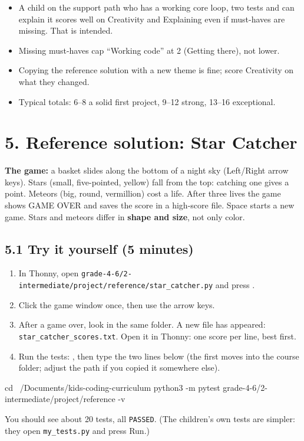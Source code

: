 \documentclass[level=2,teacher]{kidscode}
\begin{document}
\begin{teachernote}
\begin{itemize}[itemsep=1pt]
  \item A child on the support path who has a working core loop, two tests and can explain it scores
        well on Creativity and Explaining even if must-haves are missing. That is intended.
  \item Missing must-haves cap \enquote{Working code} at 2 (Getting there), not lower.
  \item Copying the reference solution with a new theme is fine; score Creativity on what they changed.
  \item Typical totals: 6--8 a solid first project, 9--12 strong, 13--16 exceptional.
\end{itemize}
\end{teachernote}

\section{5. Reference solution: Star Catcher}
\textbf{The game:} a basket slides along the bottom of a night sky (Left/Right arrow keys). Stars
(small, five-pointed, yellow) fall from the top: catching one gives a point. Meteors (big, round,
vermillion) cost a life. After three lives the game shows GAME OVER and saves the score in a
high-score file. Space starts a new game. Stars and meteors differ in \textbf{shape and size}, not only
color.

\subsection{5.1 Try it yourself (5 minutes)}
\begin{enumerate}[itemsep=1pt]
  \item In Thonny, open \texttt{grade-4-6/2-intermediate/project/reference/star\_catcher.py}
        and press .
  \item Click the game window once, then use the arrow keys.
  \item After a game over, look in the same folder. A new file has appeared:
        \texttt{star\_catcher\_scores.txt}. Open it in Thonny: one score per line, best first.
  \item Run the tests: , then type the two lines below (the first
        moves into the course folder; adjust the path if you copied it somewhere else).
\end{enumerate}
\begin{shellcode}
cd ~/Documents/kids-coding-curriculum
python3 -m pytest grade-4-6/2-intermediate/project/reference -v
\end{shellcode}
You should see about 20 tests, all \texttt{PASSED}. (The children's own tests are simpler: they open
\texttt{my\_tests.py} and press Run.)
\end{document}
